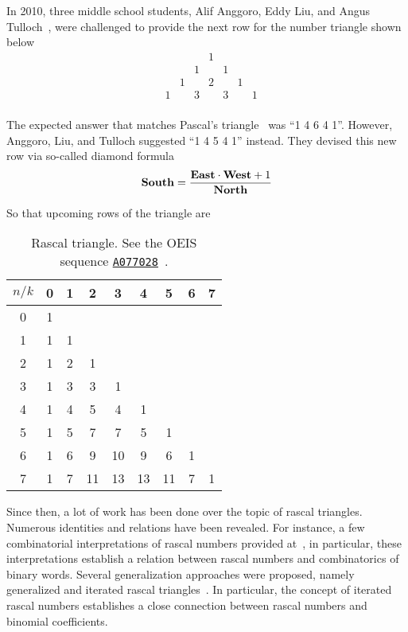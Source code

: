 In 2010, three middle school students, Alif Anggoro, Eddy Liu, and Angus Tulloch~\cite{anggoro2010rascal},
were challenged to provide the next row for the number triangle shown below
\[
    \begin{array}{cccccccc}
        &   &   &   & 1 &   &   &   \\
        &   &   & 1 &   & 1 &   &   \\
        &   & 1 &   & 2 &   & 1 &   \\
        & 1 &   & 3 &   & 3 &   & 1 \\
    \end{array}
\]

The expected answer that matches Pascal's triangle~\cite{sloane1994pascal} was ``1 4 6 4 1''.
However, Anggoro, Liu, and Tulloch suggested ``1 4 5 4 1'' instead.
They devised this new row via so-called diamond formula
\begin{align*}
    \mathbf{South}  = \frac{\mathbf{East} \cdot \mathbf{West} + 1}{\mathbf{North}}
\end{align*}

So that upcoming rows of the triangle are
\begin{table}[H]
    \begin{center}
        \setlength\extrarowheight{-6pt}
        \begin{tabular}{c|cccccccc}
            $n/k$ & 0 & 1 & 2  & 3  & 4  & 5  & 6 & 7 \\
            \hline
            0     & 1 &   &    &    &    &    &   &   \\
            1     & 1 & 1 &    &    &    &    &   &   \\
            2     & 1 & 2 & 1  &    &    &    &   &   \\
            3     & 1 & 3 & 3  & 1  &    &    &   &   \\
            4     & 1 & 4 & 5  & 4  & 1  &    &   &   \\
            5     & 1 & 5 & 7  & 7  & 5  & 1  &   &   \\
            6     & 1 & 6 & 9  & 10 & 9  & 6  & 1 &   \\
            7     & 1 & 7 & 11 & 13 & 13 & 11 & 7 & 1
        \end{tabular}
    \end{center}
    \caption{Rascal triangle. See the OEIS sequence \href{https://oeis.org/A077028}{\texttt{A077028}}~\cite{sloane2002rascal}.}
    \label{tab:rascal-triangle-i-1}
\end{table}


Since then, a lot of work has been done over the topic of rascal triangles.
Numerous identities and relations have been revealed.
For instance, a few combinatorial interpretations of rascal numbers provided at~\cite{gibbs2024two}, in particular,
these interpretations establish a relation between rascal numbers and combinatorics of binary words.
Several generalization approaches were proposed, namely generalized
and iterated rascal triangles~\cite{hotchkiss2019generalized,gregory2023iterated}.
In particular, the concept of iterated rascal numbers establishes a close connection between rascal numbers and binomial
coefficients.
